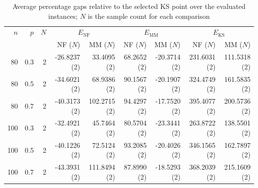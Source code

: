 \begin{table}[ht!]
\centering
\caption{Average percentage gaps relative to the selected KS point over the evaluated instances; $N$ is the sample count for each comparison}
\begin{tabular}{rrr rrr rrr}
\toprule
$n$ & $p$ & $N$ & \multicolumn{2}{c}{$E_{\mathrm{NF}}$} & \multicolumn{2}{c}{$E_{\mathrm{MM}}$} & \multicolumn{2}{c}{$E_{\mathrm{KS}}$} \\
 & & & NF ($N$) & MM ($N$) & NF ($N$) & MM ($N$) & NF ($N$) & MM ($N$) \\
\midrule
80 & 0.3 & 2 & -26.8237 (2) & 33.4095 (2) & 68.2652 (2) & -20.3714 (2) & 231.6031 (2) & 111.5318 (2) \\
80 & 0.5 & 2 & -34.6021 (2) & 68.9386 (2) & 90.1567 (2) & -20.1907 (2) & 324.4749 (2) & 161.5835 (2) \\
80 & 0.7 & 2 & -40.3173 (2) & 102.2715 (2) & 94.4297 (2) & -17.7520 (2) & 395.4077 (2) & 200.5736 (2) \\
100 & 0.3 & 2 & -32.4921 (2) & 45.7464 (2) & 80.5704 (2) & -23.3441 (2) & 263.8722 (2) & 138.5501 (2) \\
100 & 0.5 & 2 & -40.1226 (2) & 72.5124 (2) & 93.2085 (2) & -20.4026 (2) & 346.1565 (2) & 162.7897 (2) \\
100 & 0.7 & 2 & -43.3931 (2) & 111.8494 (2) & 87.8990 (2) & -18.5293 (2) & 368.2039 (2) & 215.1609 (2) \\
\bottomrule
\end{tabular}
\end{table}
